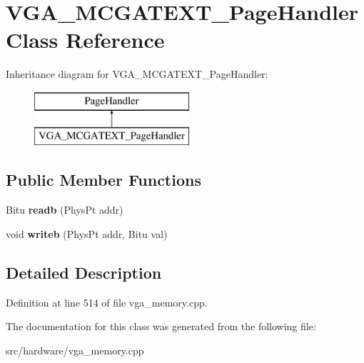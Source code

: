 \hypertarget{classVGA__MCGATEXT__PageHandler}{\section{V\-G\-A\-\_\-\-M\-C\-G\-A\-T\-E\-X\-T\-\_\-\-Page\-Handler Class Reference}
\label{classVGA__MCGATEXT__PageHandler}
}
Inheritance diagram for V\-G\-A\-\_\-\-M\-C\-G\-A\-T\-E\-X\-T\-\_\-\-Page\-Handler\-:\begin{figure}[H]
\begin{center}
\leavevmode
\includegraphics[height=2.000000cm]{classVGA__MCGATEXT__PageHandler}
\end{center}
\end{figure}
\subsection*{Public Member Functions}
\begin{DoxyCompactItemize}
\item 
\hypertarget{classVGA__MCGATEXT__PageHandler_ab40787097909e3c9726a3cf936a73bf3}{Bitu {\bfseries readb} (Phys\-Pt addr)}\label{classVGA__MCGATEXT__PageHandler_ab40787097909e3c9726a3cf936a73bf3}

\item 
\hypertarget{classVGA__MCGATEXT__PageHandler_a2dc0599364ba14ddea04a3fc16279208}{void {\bfseries writeb} (Phys\-Pt addr, Bitu val)}\label{classVGA__MCGATEXT__PageHandler_a2dc0599364ba14ddea04a3fc16279208}

\end{DoxyCompactItemize}


\subsection{Detailed Description}


Definition at line 514 of file vga\-\_\-memory.\-cpp.



The documentation for this class was generated from the following file\-:\begin{DoxyCompactItemize}
\item 
src/hardware/vga\-\_\-memory.\-cpp\end{DoxyCompactItemize}
